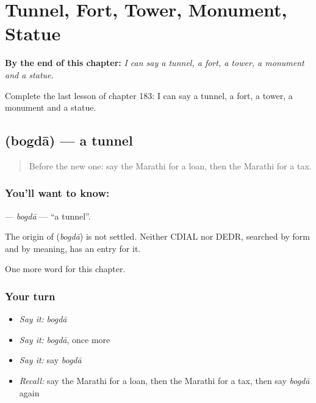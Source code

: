 
\chapter{Tunnel, Fort, Tower, Monument, Statue}
\label{ch:mr-tunnel-fort-tower-monument-statue}

\begin{chapteropening}
\textbf{By the end of this chapter:} \emph{I can say a tunnel, a fort, a tower, a monument and a statue.}

Complete the last lesson of chapter 183: I can say a tunnel, a fort, a tower, a monument and a statue.
\end{chapteropening}

\section[\texorpdfstring{\mr{बोगदा} (bogdā)}{बोगदा (bogdā)}]{ (bogdā) — a tunnel}

\label{lesson:MR-C183-bogda}



\begin{quote}
Before the new one: say the Marathi for a loan, then the Marathi for a tax.
\end{quote}

\subsection*{You'll want to know: }
\textbf{} — \emph{bogdā} — \textquotedblleft{}a tunnel\textquotedblright{}.

\begin{cousinweb}
The origin of \textbf{} (\emph{bogdā}) is not settled. Neither CDIAL nor DEDR, searched by form and by meaning, has an entry for it.
\end{cousinweb}

\begin{grammarlens}[title={What you've built}]
One more word for this chapter.
\end{grammarlens}

\subsection*{Your turn}
\begin{itemize}
\raggedright
  \item \emph{Say it:} \emph{bogdā}
  \item \emph{Say it:} \emph{bogdā}, once more
  \item \emph{Say it:} say \emph{bogdā}
  \item \emph{Recall:} say the Marathi for a loan, then the Marathi for a tax, then say \emph{bogdā} again
\end{itemize}

